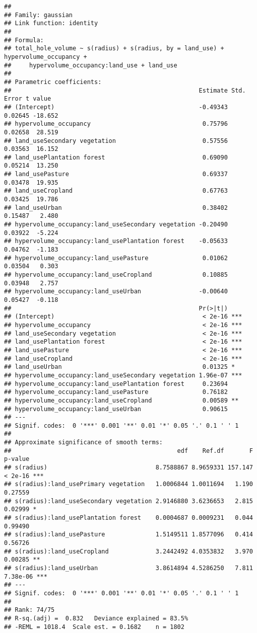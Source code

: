 \documentclass[
]{article}
\begin{document}
\begin{verbatim}
## 
## Family: gaussian 
## Link function: identity 
## 
## Formula:
## total_hole_volume ~ s(radius) + s(radius, by = land_use) + hypervolume_occupancy + 
##     hypervolume_occupancy:land_use + land_use
## 
## Parametric coefficients:
##                                                    Estimate Std. Error t value
## (Intercept)                                        -0.49343    0.02645 -18.652
## hypervolume_occupancy                               0.75796    0.02658  28.519
## land_useSecondary vegetation                        0.57556    0.03563  16.152
## land_usePlantation forest                           0.69090    0.05214  13.250
## land_usePasture                                     0.69337    0.03478  19.935
## land_useCropland                                    0.67763    0.03425  19.786
## land_useUrban                                       0.38402    0.15487   2.480
## hypervolume_occupancy:land_useSecondary vegetation -0.20490    0.03922  -5.224
## hypervolume_occupancy:land_usePlantation forest    -0.05633    0.04762  -1.183
## hypervolume_occupancy:land_usePasture               0.01062    0.03504   0.303
## hypervolume_occupancy:land_useCropland              0.10885    0.03948   2.757
## hypervolume_occupancy:land_useUrban                -0.00640    0.05427  -0.118
##                                                    Pr(>|t|)    
## (Intercept)                                         < 2e-16 ***
## hypervolume_occupancy                               < 2e-16 ***
## land_useSecondary vegetation                        < 2e-16 ***
## land_usePlantation forest                           < 2e-16 ***
## land_usePasture                                     < 2e-16 ***
## land_useCropland                                    < 2e-16 ***
## land_useUrban                                       0.01325 *  
## hypervolume_occupancy:land_useSecondary vegetation 1.96e-07 ***
## hypervolume_occupancy:land_usePlantation forest     0.23694    
## hypervolume_occupancy:land_usePasture               0.76182    
## hypervolume_occupancy:land_useCropland              0.00589 ** 
## hypervolume_occupancy:land_useUrban                 0.90615    
## ---
## Signif. codes:  0 '***' 0.001 '**' 0.01 '*' 0.05 '.' 0.1 ' ' 1
## 
## Approximate significance of smooth terms:
##                                              edf    Ref.df       F  p-value    
## s(radius)                              8.7588867 8.9659331 157.147  < 2e-16 ***
## s(radius):land_usePrimary vegetation   1.0006844 1.0011694   1.190  0.27559    
## s(radius):land_useSecondary vegetation 2.9146880 3.6236653   2.815  0.02999 *  
## s(radius):land_usePlantation forest    0.0004687 0.0009231   0.044  0.99490    
## s(radius):land_usePasture              1.5149511 1.8577096   0.414  0.56726    
## s(radius):land_useCropland             3.2442492 4.0353832   3.970  0.00285 ** 
## s(radius):land_useUrban                3.8614894 4.5286250   7.811 7.38e-06 ***
## ---
## Signif. codes:  0 '***' 0.001 '**' 0.01 '*' 0.05 '.' 0.1 ' ' 1
## 
## Rank: 74/75
## R-sq.(adj) =  0.832   Deviance explained = 83.5%
## -REML = 1018.4  Scale est. = 0.1682    n = 1802
\end{verbatim}
\end{document}
